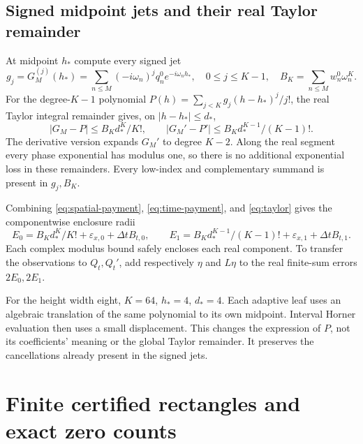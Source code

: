 \documentclass[11pt]{article}
\numberwithin{equation}{section}
\theoremstyle{definition}
\theoremstyle{remark}
\begin{document}
\subsection{Signed midpoint jets and their real Taylor remainder}
At midpoint $h_*$ compute every signed jet
\begin{equation}
 g_j=G_M^{(j)}(h_*)=\sum_{n\le M}(-i\omega_n)^jq_n^0e^{-i\omega_nh_*},
 \quad 0\le j\le K-1,
 \quad B_K=\sum_{n\le M}w_n^0\omega_n^K.
\end{equation}
For the degree-$K-1$ polynomial
$P(h)=\sum_{j<K}g_j(h-h_*)^j/j!$, the real Taylor integral
remainder gives, on $|h-h_*|\le d_*$,
\begin{equation}
 |G_M-P|\le B_Kd_*^K/K!,\qquad
 |G_M'-P'|\le B_Kd_*^{K-1}/(K-1)!.
 \label{eq:taylor}
\end{equation}
The derivative version expands $G_M'$ to degree $K-2$.
Along the real segment every phase exponential has modulus one,
so there is no additional exponential loss in these remainders.
Every low-index and complementary summand is present in $g_j,B_K$.

Combining \eqref{eq:spatial-payment}, \eqref{eq:time-payment},
and \eqref{eq:taylor} gives the componentwise enclosure radii
\begin{equation}
 E_0=B_Kd_*^K/K!+\varepsilon_{x,0}+\Delta tB_{t,0},\qquad
 E_1=B_Kd_*^{K-1}/(K-1)!+\varepsilon_{x,1}+\Delta tB_{t,1}.
 \label{eq:E}
\end{equation}
Each complex modulus bound safely encloses each real component.
To transfer the observations to $Q_t,Q_t'$, add respectively
$\eta$ and $L\eta$ to the real finite-sum errors $2E_0,2E_1$.

For the height width eight, $K=64$, $h_*=4$, $d_*=4$.
Each adaptive leaf uses an algebraic translation of the same polynomial
to its own midpoint. Interval Horner evaluation then uses a small
displacement. This changes the expression of $P$, not its coefficients'
meaning or the global Taylor remainder. It preserves the cancellations
already present in the signed jets.

\section{Finite certified rectangles and exact zero counts}
\label{sec:certificates}
\end{document}
